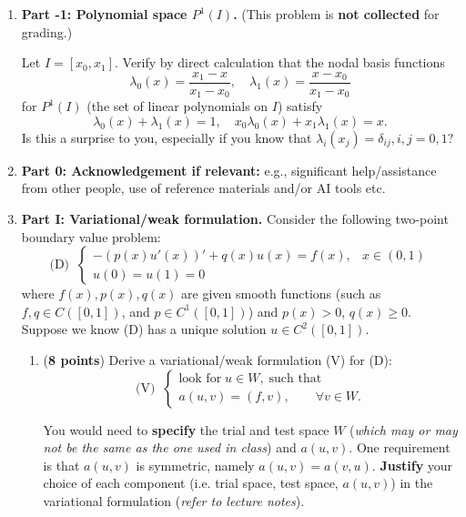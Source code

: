 \documentclass[11pt]{article}      %
\begin{document}
\begin{enumerate}

\item[]{\bf Part -1: Polynomial space $P^1(I)$.} (This problem is {\bf not collected} for grading.)

Let $I=[x_0, x_1]$. Verify by direct calculation that  the nodal basis functions 
\begin{equation}
\lambda_0(x)=\frac{x_1-x}{x_1-x_0}, \quad \lambda_1(x)=\frac{x-x_0}{x_1-x_0}
\end{equation}
for $P^1(I)$ (the set of linear polynomials on $I$) satisfy
\begin{equation}
\lambda_0(x)+\lambda_1(x)=1,\quad x_0\lambda_0(x)+ x_1\lambda_1(x)=x.
\end{equation}
Is this a surprise to you, especially if you know that $\lambda_i(x_j)=\delta_{ij}, i, j =0, 1?$ 

 
 
\item[]{\bf Part 0: Acknowledgement if relevant:} e.g., significant help/assistance from other people, use of reference materials and/or AI tools etc.
 
\newpage
\item[]{\bf Part I: Variational/weak formulation.}  Consider the following two-point boundary value problem:
\begin{displaymath}
{\textrm{(D)}} \;\;\left\{
\begin{array}{ll}
-(p(x)u'(x))'+q(x)u(x)=f(x),& x\in(0,1)\\
u(0)=u(1)=0&
\end{array}
\right.
\end{displaymath}
where $f(x), p(x), q(x)$ are given smooth functions (such as $f, q\in C([0, 1])$, and $p\in C^1([0, 1])$) and $p(x)>0$, $q(x)\geq 0$.
Suppose we know (D) has a unique solution $u\in C^2([0, 1])$.

\begin{enumerate}
\item ({\bf 8 points})
Derive a variational/weak formulation (V) for (D):
\begin{displaymath}
{\textrm{(V)}} \;\;\left\{
\begin{array}{l}
\mbox{look for} \; u\in W, \; \mbox{such that}\\
a(u, v)=(f, v),\qquad \forall v\in W.
\end{array}
\right.
\end{displaymath}

You would need to {\bf specify} the trial and test space $W$ ({\em which may or may not be the same as the one used in class}) and 
$a(u, v)$. One requirement is that 
$a(u, v)$ is symmetric, namely $a(u, v)=a(v, u)$. {\bf Justify} your choice of each component (i.e. trial space, test space, $a(u,v)$) in the variational formulation ({\em refer to lecture notes}). \\



\end{enumerate}
\end{enumerate}
\end{document}
